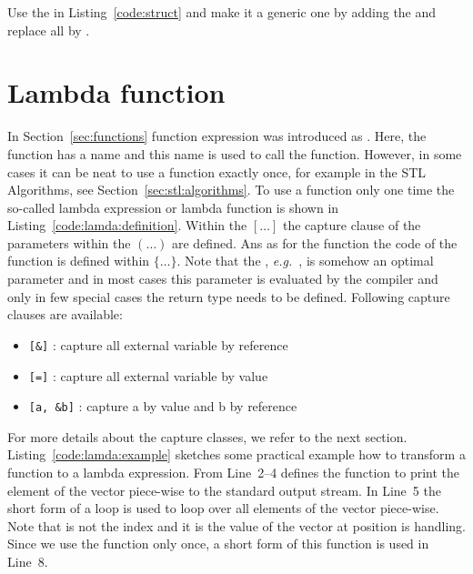 \begin{exercise}
Use the  in Listing~\ref{code:struct} and make it a generic one by adding the  and replace all  by .
\end{exercise}

\section{Lambda function}
\label{sec:lambda:function}
In Section~\ref{sec:functions} function expression was introduced as . Here, the function has a name  and this name is used to call the function. However, in some cases it can be neat to use a function exactly once, for example in the STL Algorithms, see Section~\ref{sec:stl:algorithms}. To use a function only one time the so-called lambda expression or lambda function is shown in Listing~\ref{code:lamda:definition}. Within the $[\ldots ]$ the capture clause of the parameters within the $(\ldots )$ are defined. Ans as for the function the code of the function is defined within $\{\dots \}$. Note that the , \emph{e.g.}\ , is somehow an optimal parameter and in most cases this parameter is evaluated by the compiler and only in few special cases the return type needs to be defined. Following capture clauses are available:
\begin{itemize}
\item  \lstinline|[&]| : capture all external variable by reference
\item  \lstinline|[=]| : capture all external variable by value
\item  \lstinline|[a, &b]| : capture a by value and b by reference
\end{itemize}
For more details about the capture classes, we refer to the next section.\\

Listing~\ref{code:lamda:example} sketches some practical example how to transform a function to a lambda expression. From Line~2--4 defines the function to print the element of the vector piece-wise to the standard output stream. In Line~5 the short form of a  loop is used to loop over all elements of the vector piece-wise. Note that  is not the index and it is the value of the vector at position  is handling. Since we use the function  only once, a short form of this function is used in Line~8. 

